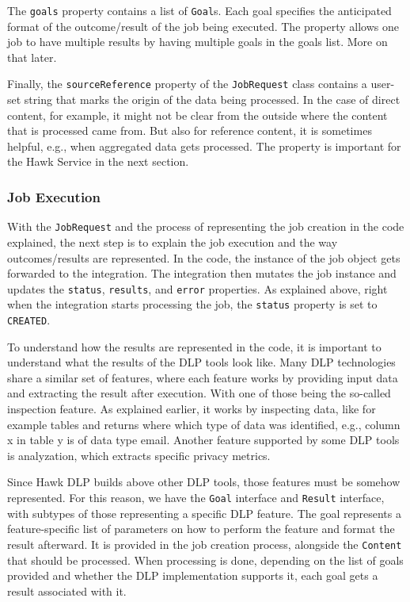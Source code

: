 The \texttt{goals} property contains a list of \texttt{Goal}s. Each goal specifies the anticipated format of the outcome/result of the job being executed. The property allows one job to have multiple results by having multiple goals in the goals list. More on that later.

Finally, the \texttt{sourceReference} property of the \texttt{JobRequest} class contains a user-set string that marks the origin of the data being processed. In the case of direct content, for example, it might not be clear from the outside where the content that is processed came from. But also for reference content, it is sometimes helpful, e.g., when aggregated data gets processed. The property is important for the Hawk Service in the next section.

\subsubsection{Job Execution}

With the \texttt{JobRequest} and the process of representing the job creation in the code explained, the next step is to explain the job execution and the way outcomes/results are represented. In the code, the instance of the job object gets forwarded to the integration. The integration then mutates the job instance and updates the \texttt{status}, \texttt{results}, and \texttt{error} properties. As explained above, right when the integration starts processing the job, the \texttt{status} property is set to \texttt{CREATED}.

To understand how the results are represented in the code, it is important to understand what the results of the DLP tools look like. Many DLP technologies share a similar set of features, where each feature works by providing input data and extracting the result after execution. With one of those being the so-called inspection feature. As explained earlier, it works by inspecting data, like for example tables and returns where which type of data was identified, e.g., column x in table y is of data type email. Another feature supported by some DLP tools is analyzation, which extracts specific privacy metrics.

Since Hawk DLP builds above other DLP tools, those features must be somehow represented. For this reason, we have the \texttt{Goal} interface and \texttt{Result} interface, with subtypes of those representing a specific DLP feature. The goal represents a feature-specific list of parameters on how to perform the feature and format the result afterward. It is provided in the job creation process, alongside the \texttt{Content} that should be processed. When processing is done, depending on the list of goals provided and whether the DLP implementation supports it, each goal gets a result associated with it.

